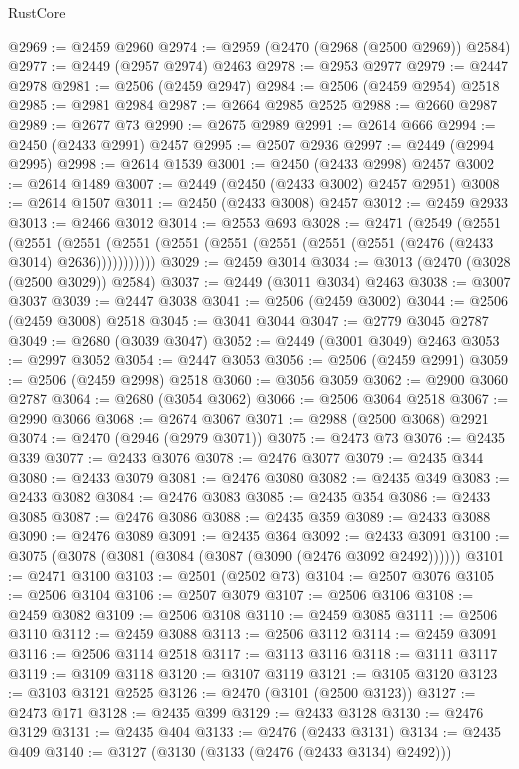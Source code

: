\begin{lexlean}{RustCore}
\begin{coremodule}
@2969 := @2459 @2960
@2974 := @2959 (@2470 (@2968 (@2500 @2969)) @2584)
@2977 := @2449 (@2957 @2974) @2463
@2978 := @2953 @2977
@2979 := @2447 @2978
@2981 := @2506 (@2459 @2947)
@2984 := @2506 (@2459 @2954) @2518
@2985 := @2981 @2984
@2987 := @2664 @2985 @2525
@2988 := @2660 @2987
@2989 := @2677 @73
@2990 := @2675 @2989
@2991 := @2614 @666
@2994 := @2450 (@2433 @2991) @2457
@2995 := @2507 @2936
@2997 := @2449 (@2994 @2995)
@2998 := @2614 @1539
@3001 := @2450 (@2433 @2998) @2457
@3002 := @2614 @1489
@3007 := @2449 (@2450 (@2433 @3002) @2457 @2951)
@3008 := @2614 @1507
@3011 := @2450 (@2433 @3008) @2457
@3012 := @2459 @2933
@3013 := @2466 @3012
@3014 := @2553 @693
@3028 := @2471
    (@2549
      (@2551
        (@2551
          (@2551 (@2551 (@2551 (@2551 (@2551 (@2551 (@2551 (@2476 (@2433 @3014) @2636)))))))))))
@3029 := @2459 @3014
@3034 := @3013 (@2470 (@3028 (@2500 @3029)) @2584)
@3037 := @2449 (@3011 @3034) @2463
@3038 := @3007 @3037
@3039 := @2447 @3038
@3041 := @2506 (@2459 @3002)
@3044 := @2506 (@2459 @3008) @2518
@3045 := @3041 @3044
@3047 := @2779 @3045 @2787
@3049 := @2680 (@3039 @3047)
@3052 := @2449 (@3001 @3049) @2463
@3053 := @2997 @3052
@3054 := @2447 @3053
@3056 := @2506 (@2459 @2991)
@3059 := @2506 (@2459 @2998) @2518
@3060 := @3056 @3059
@3062 := @2900 @3060 @2787
@3064 := @2680 (@3054 @3062)
@3066 := @2506 @3064 @2518
@3067 := @2990 @3066
@3068 := @2674 @3067
@3071 := @2988 (@2500 @3068) @2921
@3074 := @2470 (@2946 (@2979 @3071))
@3075 := @2473 @73
@3076 := @2435 @339
@3077 := @2433 @3076
@3078 := @2476 @3077
@3079 := @2435 @344
@3080 := @2433 @3079
@3081 := @2476 @3080
@3082 := @2435 @349
@3083 := @2433 @3082
@3084 := @2476 @3083
@3085 := @2435 @354
@3086 := @2433 @3085
@3087 := @2476 @3086
@3088 := @2435 @359
@3089 := @2433 @3088
@3090 := @2476 @3089
@3091 := @2435 @364
@3092 := @2433 @3091
@3100 := @3075 (@3078 (@3081 (@3084 (@3087 (@3090 (@2476 @3092 @2492))))))
@3101 := @2471 @3100
@3103 := @2501 (@2502 @73)
@3104 := @2507 @3076
@3105 := @2506 @3104
@3106 := @2507 @3079
@3107 := @2506 @3106
@3108 := @2459 @3082
@3109 := @2506 @3108
@3110 := @2459 @3085
@3111 := @2506 @3110
@3112 := @2459 @3088
@3113 := @2506 @3112
@3114 := @2459 @3091
@3116 := @2506 @3114 @2518
@3117 := @3113 @3116
@3118 := @3111 @3117
@3119 := @3109 @3118
@3120 := @3107 @3119
@3121 := @3105 @3120
@3123 := @3103 @3121 @2525
@3126 := @2470 (@3101 (@2500 @3123))
@3127 := @2473 @171
@3128 := @2435 @399
@3129 := @2433 @3128
@3130 := @2476 @3129
@3131 := @2435 @404
@3133 := @2476 (@2433 @3131)
@3134 := @2435 @409
@3140 := @3127 (@3130 (@3133 (@2476 (@2433 @3134) @2492)))

\end{coremodule}
\end{lexlean}
